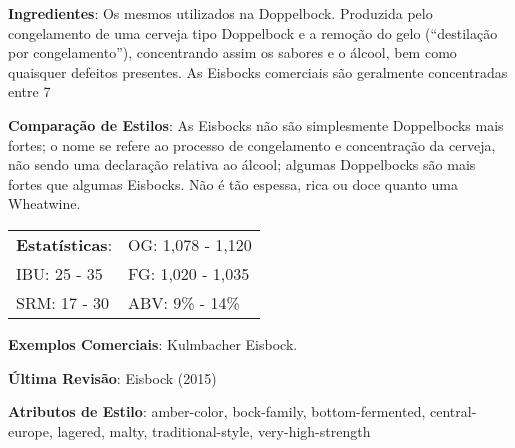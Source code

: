 \textbf{Ingredientes}: Os mesmos utilizados na Doppelbock. Produzida pelo congelamento de uma cerveja tipo Doppelbock e a remoção do gelo (“destilação por congelamento”), concentrando assim os sabores e o álcool, bem como quaisquer defeitos presentes. As Eisbocks comerciais são geralmente concentradas entre 7%

\textbf{Comparação de Estilos}: As Eisbocks não são simplesmente Doppelbocks mais fortes; o nome se refere ao processo de congelamento e concentração da cerveja, não sendo uma declaração relativa ao álcool; algumas Doppelbocks são mais fortes que algumas Eisbocks. Não é tão espessa, rica ou doce quanto uma Wheatwine.

\begin{tabular}{@{}p{35mm}p{35mm}@{}}
  \textbf{Estatísticas}: & OG: 1,078 - 1,120 \\
  IBU: 25 - 35 & FG: 1,020 - 1,035 \\
  SRM: 17 - 30 & ABV: 9\% - 14\%
\end{tabular}

\textbf{Exemplos Comerciais}: Kulmbacher Eisbock.

\textbf{Última Revisão}: Eisbock (2015)

\textbf{Atributos de Estilo}: amber-color, bock-family, bottom-fermented, central-europe, lagered, malty, traditional-style, very-high-strength

